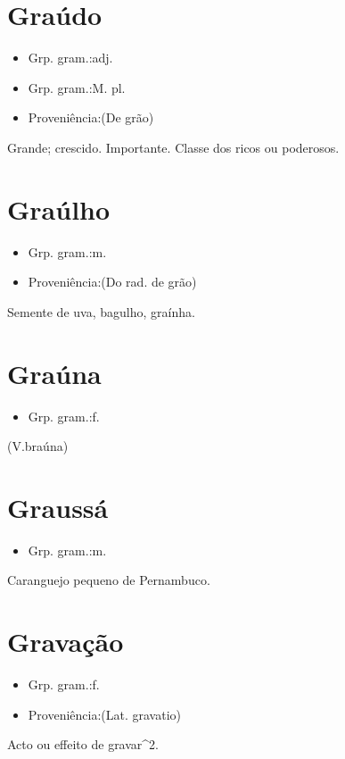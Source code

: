 \section{Graúdo}
\begin{itemize}
\item {Grp. gram.:adj.}
\end{itemize}
\begin{itemize}
\item {Grp. gram.:M. pl.}
\end{itemize}
\begin{itemize}
\item {Proveniência:(De \textunderscore grão\textunderscore )}
\end{itemize}
Grande; crescido.
Importante.
Classe dos ricos ou poderosos.
\section{Graúlho}
\begin{itemize}
\item {Grp. gram.:m.}
\end{itemize}
\begin{itemize}
\item {Proveniência:(Do rad. de \textunderscore grão\textunderscore )}
\end{itemize}
Semente de uva, bagulho, graínha.
\section{Graúna}
\begin{itemize}
\item {Grp. gram.:f.}
\end{itemize}
(V.braúna)
\section{Graussá}
\begin{itemize}
\item {Grp. gram.:m.}
\end{itemize}
Caranguejo pequeno de Pernambuco.
\section{Gravação}
\begin{itemize}
\item {Grp. gram.:f.}
\end{itemize}
\begin{itemize}
\item {Proveniência:(Lat. \textunderscore gravatio\textunderscore )}
\end{itemize}
Acto ou effeito de gravar^2.
